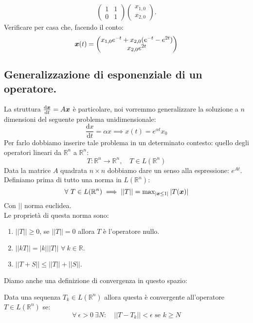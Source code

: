 \begin{exmp}
\[\begin{aligned}
	  \begin{pmatrix} 1 & 1 \\ 0 & 1 \end{pmatrix} \begin{pmatrix} x_{1, 0}\\ x_{2, 0} \end{pmatrix} 
      .\end{aligned}\]
      Verificare per casa che, facendo il conto:
      \[
	  \boldsymbol{x} (t)= \begin{pmatrix} x_{1, 0}e^{-t}+x_{2, 0}(e^{-t}-e^{2t})\\x_{2, 0}e^{2t} \end{pmatrix} 
      \] 
\end{exmp}
\noindent
\subsection{Generalizzazione di esponenziale di un operatore.}%
La struttura $\frac{\text{d} \boldsymbol{x}}{\text{d} t} = A \boldsymbol{x} $ è particolare, noi vorremmo generalizzare la soluzione a $n$ dimensioni del seguente problema unidimensionale:
\[
    \frac{\text{d} x}{\text{d} t} = \alpha x \implies  x(t)= e^{\alpha t}x_0
\] 
Per farlo dobbiamo inserire tale problema in un determinato contesto: quello degli operatori lineari da $\mathbb{R}^n$ a $\mathbb{R}^n$:
\[
    T: \mathbb{R}^n\to \mathbb{R}^n, \quad T \in L(\mathbb{R}^n)
\] 
Data la matrice $A$ quadrata $n\times n$ dobbiamo dare un senso alla espressione: $e^{At}$.\\
Definiamo prima di tutto una norma in $L(\mathbb{R}^n)$:
\[
    \forall \ T \in L(\mathbb{R}^n) \implies  \left|\left|T\right|\right| = \text{max}_{\left|\boldsymbol{x}\le 1\right|}\left|T(\boldsymbol{x})\right|
\] 
Con $\left|\right|$ norma euclidea.\\
Le proprietà di questa norma sono:
\begin{enumerate}
    \item $\left|\left|T\right|\right|\ge 0$, se $\left|\left|T\right|\right|=0$ allora $T$ è l'operatore nullo.
    \item $\left|\left|kT\right|\right|= \left|k\right|\left|\left|T\right|\right|$ $\forall \ k \in \mathbb{R}$.
    \item $\left|\left|T+S\right|\right|\le \left|\left|T\right|\right| + \left|\left|S\right|\right|$.
\end{enumerate}
Diamo anche una definizione di convergenza in questo spazio:
\begin{defn}
    Data una sequenza $T_k \in L(\mathbb{R}^n)$ allora questa è convergente all'operatore $T \in L(\mathbb{R}^n)$ se:
    \[
        \forall \ \epsilon >0 \ \exists N: \quad \left|\left|T-T_k\right|\right|<\epsilon  \text{ se } k \ge N
    \] 
\end{defn}
